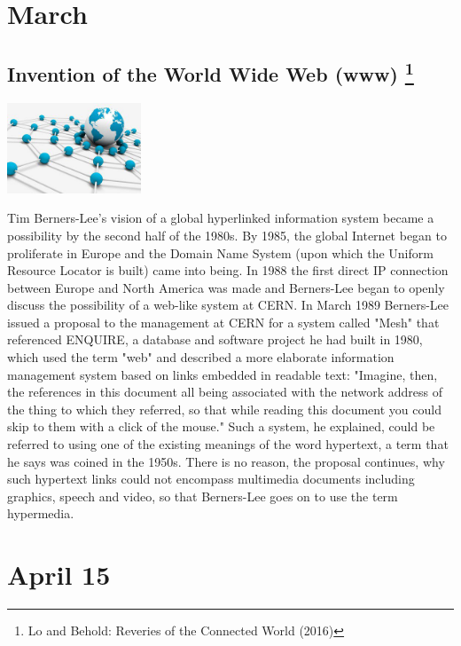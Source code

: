 \documentclass[11pt]{report}
\begin{document}
\section{March}
\subsection{Invention of the World Wide Web (www) \protect\footnote{Lo and Behold: Reveries of the Connected World (2016)}}
\vspace{2mm}\begin{center}\includegraphics[width=4cm]{./img/www.jpg}\end{center}
Tim Berners-Lee's vision of a global hyperlinked information system became a possibility by the second half of the 1980s. By 1985, the global Internet began to proliferate in Europe and the Domain Name System (upon which the Uniform Resource Locator is built) came into being. In 1988 the first direct IP connection between Europe and North America was made and Berners-Lee began to openly discuss the possibility of a web-like system at CERN. In March 1989 Berners-Lee issued a proposal to the management at CERN for a system called "Mesh" that referenced ENQUIRE, a database and software project he had built in 1980, which used the term "web" and described a more elaborate information management system based on links embedded in readable text: "Imagine, then, the references in this document all being associated with the network address of the thing to which they referred, so that while reading this document you could skip to them with a click of the mouse." Such a system, he explained, could be referred to using one of the existing meanings of the word hypertext, a term that he says was coined in the 1950s. There is no reason, the proposal continues, why such hypertext links could not encompass multimedia documents including graphics, speech and video, so that Berners-Lee goes on to use the term hypermedia.
\section{April 15}
\end{document}
